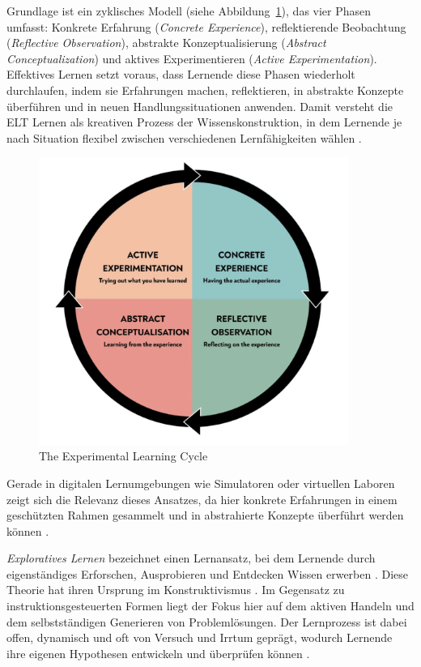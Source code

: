 Grundlage ist ein zyklisches Modell (siehe Abbildung~\ref{fig:etl_cycle}), das vier Phasen umfasst: Konkrete Erfahrung (\textit{Concrete Experience}), reflektierende Beobachtung (\textit{Reflective Observation}), abstrakte Konzeptualisierung (\textit{Abstract Conceptualization}) und aktives Experimentieren (\textit{Active Experimentation}). Effektives Lernen setzt voraus, dass Lernende diese Phasen wiederholt durchlaufen, indem sie Erfahrungen machen, reflektieren, in abstrakte Konzepte überführen und in neuen Handlungssituationen anwenden. Damit versteht die ELT Lernen als kreativen Prozess der Wissenskonstruktion, in dem Lernende je nach Situation flexibel zwischen verschiedenen Lernfähigkeiten wählen \parencite[S.~2f]{mccarthy_experiential_2010}.

\begin{figure}[htbp]
    \centering
    \includegraphics[width=0.90\textwidth]{img/ELT_cycle.png}
    \caption{The Experimental Learning Cycle~	\cite{mcleod_kolbs_2025}}
    \label{fig:etl_cycle}
\end{figure}

Gerade in digitalen Lernumgebungen wie Simulatoren oder virtuellen Laboren zeigt sich die Relevanz dieses Ansatzes, da hier konkrete Erfahrungen in einem geschützten Rahmen gesammelt und in abstrahierte Konzepte überführt werden können \parencites[S.~3182]{reyes_enhancing_2024}[S.~7]{bazie_effect_2024}.

\textit{Exploratives Lernen} bezeichnet einen Lernansatz, bei dem Lernende durch eigenständiges Erforschen, Ausprobieren und Entdecken Wissen erwerben \parencite[S.~15]{grabinger_rich_2016}. Diese Theorie hat ihren Ursprung im Konstruktivismus \parencite[S.~271]{kornelsen_expedition_2005}. Im Gegensatz zu instruktionsgesteuerten Formen liegt der Fokus hier auf dem aktiven Handeln und dem selbstständigen Generieren von Problemlösungen. Der Lernprozess ist dabei offen, dynamisch und oft von Versuch und Irrtum geprägt, wodurch Lernende ihre eigenen Hypothesen entwickeln und überprüfen können \parencite[S.~141]{lucke_strukturierte_2005}.

